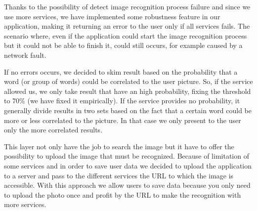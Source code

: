 Thanks to the possibility of detect image recognition process failure and since 
we use more services, we have implemented some robustness feature in our 
application, making it returning an error to the user only if all services fails. 
The scenario where, even if the application could start the image recognition 
process but it could not be able to finish it, could still occurs, for example 
caused by a network fault.

If no errors occurs, we decided to skim result based on the probability that a 
word (or group of words) could be correlated to the user picture. So, if the 
service allowed us, we only take result that have an high probability, fixing the 
threshold to 70\% (we have fixed it empirically). If the service provides no 
probability, it generally divide results in two sets based on the fact that a 
certain word could be more or less correlated to the picture. In that case we 
only present to the user only the more correlated results.

This layer not only have the job to search the image but it have to offer the 
possibility to upload the image that must be recognized. Because of limitation 
of some services and in order to save user data we decided to upload the 
application to a server and pass to the different services the URL to which the 
image is accessible. With this approach we allow users to save data because you 
only need to upload the photo once and profit by the URL to make the recognition 
with more services.